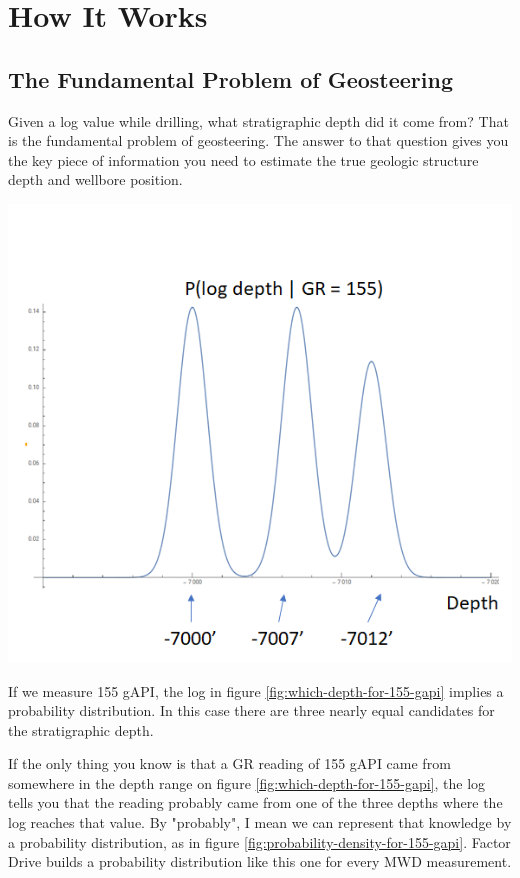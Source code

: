 \documentclass{tufte-handout}
\begin{document}
\section{How It Works}\label{sec:how-it-doesnt-work}
\subsection{The Fundamental Problem of Geosteering}\label{sec:fundamental-problem}

Given a log value while drilling, what stratigraphic depth did it come from? That is the 
fundamental problem of geosteering. The answer to that question gives you the key piece of information you need
to estimate the true geologic structure depth and wellbore position.

\begin{marginfigure}
  \includegraphics{probability-density-for-155-gapi.png}
  \caption{If we measure 155 gAPI, the log in figure \ref{fig:which-depth-for-155-gapi} implies
  a probability distribution. In this case there are three nearly equal candidates for the 
  stratigraphic depth.}
  \label{fig:probability-density-for-155-gapi}
\end{marginfigure}

If the only thing you know is that a GR reading of 155 gAPI came from somewhere in the depth range on figure
\ref{fig:which-depth-for-155-gapi}, the log tells you that the reading probably came from one of the three depths where the log reaches that value. By "probably", I mean we can represent that knowledge by a
probability distribution, as in figure \ref{fig:probability-density-for-155-gapi}. Factor Drive 
builds a probability distribution like this one for every MWD measurement.
\end{document}
